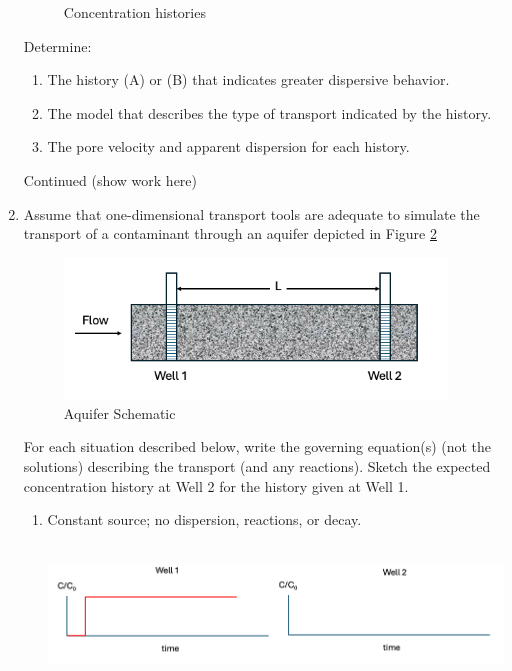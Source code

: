 \documentclass[12pt]{article}
\begin{document}
\begin{enumerate}
\begin{figure}[h!]
   \caption{Concentration histories}
   \label{fig:history1}
\end{figure}
Determine:
\begin{enumerate}
\item The history (A) or (B) that indicates greater dispersive behavior.
\item The model that describes the type of transport indicated by the history.
\item The pore velocity and apparent dispersion for each history.
\end{enumerate}
\clearpage
Continued (show work here)
\clearpage %
\item Assume that one-dimensional transport tools are adequate to simulate the transport of a contaminant through an aquifer depicted in Figure \ref{fig:aquifer1}
\begin{figure}[h!] %
   \centering
   \includegraphics[width=4in]{aquifer1.png} 
   \caption{Aquifer Schematic}
   \label{fig:aquifer1}
\end{figure}
For each situation described below, write the governing equation(s) (not the solutions) describing the transport (and any reactions). Sketch the expected concentration history at Well 2 for the history given at Well 1.
\begin{enumerate}
\item Constant source; no dispersion, reactions, or decay. ~\\~\\
\begin{center}
\includegraphics[width=6in]{WellsHistory.png} 
\end{center}

\end{enumerate}
\end{enumerate}
\end{document}
